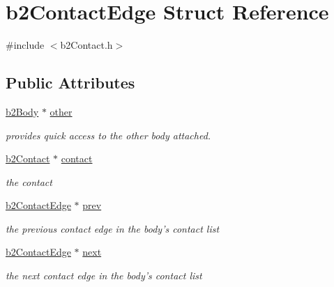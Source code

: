 \hypertarget{structb2_contact_edge}{\section{b2\-Contact\-Edge Struct Reference}
\label{structb2_contact_edge}
}


{\ttfamily \#include $<$b2\-Contact.\-h$>$}

\subsection*{Public Attributes}
\begin{DoxyCompactItemize}
\item 
\hypertarget{structb2_contact_edge_a69015fc22e064eac04ed74f27a13ae78}{\hyperlink{classb2_body}{b2\-Body} $\ast$ \hyperlink{structb2_contact_edge_a69015fc22e064eac04ed74f27a13ae78}{other}}\label{structb2_contact_edge_a69015fc22e064eac04ed74f27a13ae78}

\begin{DoxyCompactList}\small\item\em provides quick access to the other body attached. \end{DoxyCompactList}\item 
\hypertarget{structb2_contact_edge_a2fbfaffa0dfdf715fd1a709cff939dee}{\hyperlink{classb2_contact}{b2\-Contact} $\ast$ \hyperlink{structb2_contact_edge_a2fbfaffa0dfdf715fd1a709cff939dee}{contact}}\label{structb2_contact_edge_a2fbfaffa0dfdf715fd1a709cff939dee}

\begin{DoxyCompactList}\small\item\em the contact \end{DoxyCompactList}\item 
\hypertarget{structb2_contact_edge_a606dfacb78dc5c51672e4d7449006b8c}{\hyperlink{structb2_contact_edge}{b2\-Contact\-Edge} $\ast$ \hyperlink{structb2_contact_edge_a606dfacb78dc5c51672e4d7449006b8c}{prev}}\label{structb2_contact_edge_a606dfacb78dc5c51672e4d7449006b8c}

\begin{DoxyCompactList}\small\item\em the previous contact edge in the body's contact list \end{DoxyCompactList}\item 
\hypertarget{structb2_contact_edge_a9af32b3cfadf35a927f4dffcf6338a6d}{\hyperlink{structb2_contact_edge}{b2\-Contact\-Edge} $\ast$ \hyperlink{structb2_contact_edge_a9af32b3cfadf35a927f4dffcf6338a6d}{next}}\label{structb2_contact_edge_a9af32b3cfadf35a927f4dffcf6338a6d}

\begin{DoxyCompactList}\small\item\em the next contact edge in the body's contact list \end{DoxyCompactList}\end{DoxyCompactItemize}


